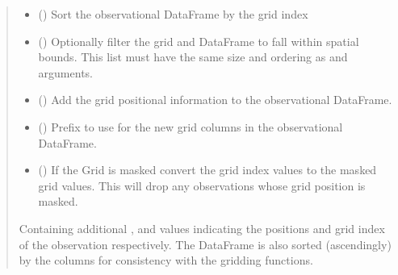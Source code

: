 \documentclass[letterpaper,10pt,english]{sphinxmanual}
\begin{document}
\begin{fulllineitems}
\begin{fulllineitems}
\begin{quote}
\begin{description}
\begin{itemize}
\item {}
\sphinxAtStartPar
{} () \textendash{} Sort the observational DataFrame by the grid index

\item {}
\sphinxAtStartPar
{} (\sphinxstyleliteralemphasis{\sphinxupquote{{[}}}\sphinxstyleliteralemphasis{\sphinxupquote{{[}}}\sphinxstyleliteralemphasis{\sphinxupquote{, }}\sphinxstyleliteralemphasis{\sphinxupquote{{]}}}\sphinxstyleliteralemphasis{\sphinxupquote{{]} }}\sphinxstyleliteralemphasis{\sphinxupquote{| }}) \textendash{} Optionally filter the grid and DataFrame to fall within spatial
bounds. This list must have the same size and ordering as
 and  arguments.

\item {}
\sphinxAtStartPar
{} () \textendash{} Add the grid positional information to the observational DataFrame.

\item {}
\sphinxAtStartPar
{} () \textendash{} Prefix to use for the new grid columns in the observational
DataFrame.

\item {}
\sphinxAtStartPar
{} () \textendash{} If the Grid is masked convert the grid index values to the masked
grid values. This will drop any observations whose grid position is
masked.

\end{itemize}

\sphinxAtStartPar
{} \textendash{} Containing additional , and  values
indicating the positions and grid index of the observation
respectively. The DataFrame is also sorted (ascendingly) by the
 columns for consistency with the gridding functions.


\end{description}
\end{quote}
\end{fulllineitems}
\end{fulllineitems}
\end{document}
